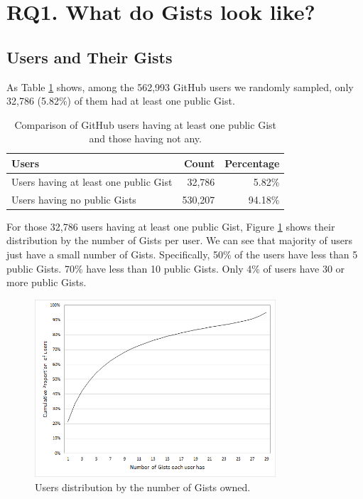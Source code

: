 \section{RQ1. What do Gists look like?}

\subsection{Users and Their Gists}

As Table \ref{tb:userdistribution} shows, among the 562,993 GitHub users we randomly sampled, only 32,786 (5.82\%) of them had at least one public Gist. 

\begin{table}[!htb]
 \begin{center}
 \begin{tabular}{@{}lrr} 
    \textbf{Users} &   \textbf{Count}        &  \textbf{Percentage} \\ \hline
    Users having at least one public Gist      &   32,786                 &   5.82\%             \\ 
    Users having no public Gists               &   530,207                &   94.18\%             \\ \hline
 \end{tabular}
 \end{center}
 \caption{Comparison of GitHub users having at least one public Gist and those having not any.}
 \label{tb:userdistribution}
\end{table}

For those 32,786 users having at least one public Gist, Figure \ref{fig:gistproportion} shows their distribution by the number of Gists per user. We can see that majority of users just have a small number of Gists. Specifically, 50\% of the users have less than 5 public Gists. 70\% have less than 10 public Gists. Only 4\% of users have 30 or more public Gists.

\begin{figure}[!htb]
	\centering
	\includegraphics[width=0.8\textwidth]{figures/GistProportion.png}
	\caption{Users distribution by the number of Gists owned.}
	\label{fig:gistproportion}
\end{figure}

